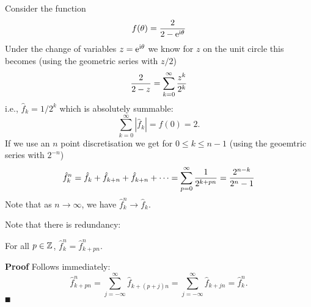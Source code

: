 \begin{example} Consider the function
\[
f(\theta) = {2 \over 2 - {\rm e}^{{\rm i} \theta}}
\]
Under the change of variables $z = {\rm e}^{{\rm i} \theta}$ we know for $z$ on the unit circle this becomes (using the geometric series with $z/2$)
\[
{2 \over 2-z} = \ensuremath{\sum}_{k=0}^\ensuremath{\infty} {z^k \over 2^k}
\]
i.e., $\hat f_k = 1/2^k$ which is absolutely summable:
\[
\ensuremath{\sum}_{k=0}^\ensuremath{\infty} |\hat f_k| = f(0) = 2.
\]
If we use an $n$ point discretisation we get for $0 \ensuremath{\leq} k \ensuremath{\leq} n-1$ (using the geoemtric series with $2^{-n}$)
\[
\hat f_k^n = \hat f_k + \hat f_{k+n} + \hat f_{k+n} + \ensuremath{\cdots} = \ensuremath{\sum}_{p=0}^\ensuremath{\infty} {1 \over 2^{k+pn}} = {2^{n-k} \over 2^n - 1}
\]
Note that as $n \rightarrow \ensuremath{\infty}$, we have $\hat f_k^n \rightarrow \hat f_k$. \end{example}

Note that there is redundancy:

\begin{corollary}[aliasing] For all $p \in {\mathbb Z}$, $\hat f_k^n = \hat f_{k+pn}^n$.

\end{corollary}
\textbf{Proof} Follows immediately:
\[
\hat f_{k+pn}^n = \sum_{j=-\ensuremath{\infty}}^\ensuremath{\infty} \hat f_{k+(p+j)n}= \sum_{j=-\ensuremath{\infty}}^\ensuremath{\infty} \hat f_{k+j n} = \hat f_k^n.
\]
\ensuremath{\QED}

